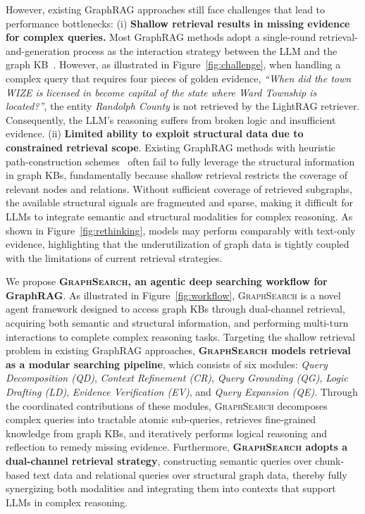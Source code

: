 However, existing GraphRAG approaches still face challenges that lead to performance bottlenecks: (i) \textbf{Shallow retrieval results in missing evidence for complex queries.} Most GraphRAG methods adopt a single-round retrieval-and-generation process as the interaction strategy between the LLM and the graph KB~\citep{graphrag, lightrag, minirag}. However, as illustrated in Figure~\ref{fig:challenge}, when handling a complex query that requires four pieces of golden evidence, \textit{``When did the town WIZE is licensed in become capital of the state where Ward Township is located?''}, the entity \textit{Randolph County} is not retrieved by the LightRAG retriever. Consequently, the LLM’s reasoning suffers from broken logic and insufficient evidence. (ii) \textbf{Limited ability to exploit structural data due to constrained retrieval scope}. Existing GraphRAG methods with heuristic path-construction schemes~\citep{minirag, pathrag, hipporag} often fail to fully leverage the structural information in graph KBs, fundamentally because shallow retrieval restricts the coverage of relevant nodes and relations. Without sufficient coverage of retrieved subgraphs, the available structural signals are fragmented and sparse, making it difficult for LLMs to integrate semantic and structural modalities for complex reasoning. As shown in Figure~\ref{fig:rethinking}, models may perform comparably with text-only evidence, highlighting that the underutilization of graph data is tightly coupled with the limitations of current retrieval strategies.

We propose \textbf{\textsc{GraphSearch}, an agentic deep searching workflow for GraphRAG}. As illustrated in Figure~\ref{fig:workflow}, \textsc{GraphSearch} is a novel agent framework designed to access graph KBs through dual-channel retrieval, acquiring both semantic and structural information, and performing multi-turn interactions to complete complex reasoning tasks. Targeting the shallow retrieval problem in existing GraphRAG approaches, \textbf{\textsc{GraphSearch} models retrieval as a modular searching pipeline}, which consists of six modules: \textit{Query Decomposition (QD)}, \textit{Context Refinement (CR)}, \textit{Query Grounding (QG)}, \textit{Logic Drafting (LD)}, \textit{Evidence Verification (EV)}, and \textit{Query Expansion (QE)}. Through the coordinated contributions of these modules, \textsc{GraphSearch} decomposes complex queries into tractable atomic sub-queries, retrieves fine-grained knowledge from graph KBs, and iteratively performs logical reasoning and reflection to remedy missing evidence. Furthermore, \textbf{\textsc{GraphSearch} adopts a dual-channel retrieval strategy}, constructing semantic queries over chunk-based text data and relational queries over structural graph data, thereby fully synergizing both modalities and integrating them into contexts that support LLMs in complex reasoning.

